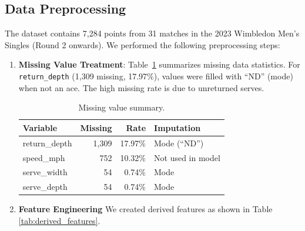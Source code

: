 \documentclass{mcmthesis}
\begin{document}
\subsection{Data Preprocessing}

The dataset contains 7,284 points from 31 matches in the 2023 Wimbledon Men's Singles (Round 2 onwards). We performed the following preprocessing steps:

\begin{enumerate}
    \item \textbf{Missing Value Treatment}: Table~\ref{tab:missing} summarizes missing data statistics. For \texttt{return\_depth} (1,309 missing, 17.97\%), values were filled with ``ND'' (mode) when not an ace. The high missing rate is due to unreturned serves.
    
    \begin{table}[h]
    \centering
    \caption{Missing value summary.}
    \label{tab:missing}
    \begin{tabular}{lrrl}
    \toprule
    \textbf{Variable} & \textbf{Missing} & \textbf{Rate} & \textbf{Imputation} \\
    \midrule
    return\_depth & 1,309 & 17.97\% & Mode (``ND'') \\
    speed\_mph & 752 & 10.32\% & Not used in model \\
    serve\_width & 54 & 0.74\% & Mode \\
    serve\_depth & 54 & 0.74\% & Mode \\
    \bottomrule
    \end{tabular}
    \end{table}
    

\item \textbf{Feature Engineering}
We created derived features as shown in Table \ref{tab:derived_features}.

\begin{table}[H]
    \centering
    \small  %
    \caption{Derived Features for Tennis Match Analysis}  %
    \label{tab:derived_features}  %
    

\end{table}
\end{enumerate}
\end{document}
